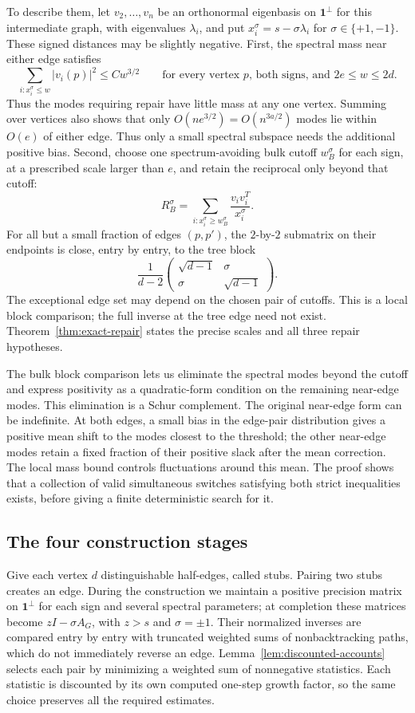 To describe them, let $v_2,\ldots,v_n$ be an orthonormal eigenbasis on
$\mathbf1^\perp$ for this intermediate graph, with eigenvalues
$\lambda_i$, and put $x_i^\sigma=s-\sigma\lambda_i$ for
$\sigma\in\{+1,-1\}$. These signed distances may be slightly negative.
First, the spectral mass near either edge satisfies
\[
 \sum_{i:x_i^\sigma\le w}|v_i(p)|^2\le Cw^{3/2}
 \qquad\text{for every vertex $p$, both signs, and $2e\le w\le2d$}.
\]
Thus the modes requiring repair have little mass at any one vertex.
Summing over vertices also shows that only $O(ne^{3/2})=O(n^{3a/2})$
modes lie within $O(e)$ of either edge. Thus only a small spectral
subspace needs the additional positive bias.
Second, choose one spectrum-avoiding bulk cutoff $w_B^\sigma$ for each sign,
at a prescribed scale larger than $e$, and retain the reciprocal only beyond that cutoff:
\[
 R_B^\sigma=\sum_{i:x_i^\sigma\ge w_B^\sigma}
                  \frac{v_iv_i^T}{x_i^\sigma}.
\]
For all but a small fraction of edges $(p,p')$, the $2$-by-$2$ submatrix
on their endpoints is close, entry by entry, to the tree block
\[
 \frac1{d-2}
 \begin{pmatrix}\sqrt{d-1}&\sigma\\ \sigma&\sqrt{d-1}\end{pmatrix}.
\]
The exceptional edge set may depend on the chosen pair of cutoffs.
This is a local block comparison; the full inverse at the tree edge
need not exist. Theorem~\ref{thm:exact-repair} states the precise scales
and all three repair hypotheses.

The bulk block comparison lets us eliminate the spectral modes beyond
the cutoff and express positivity as a quadratic-form condition on the
remaining near-edge modes. This elimination is a Schur complement.
The original near-edge form can be indefinite. At both edges, a small bias
in the edge-pair distribution gives a positive mean shift to the modes
closest to the threshold; the other near-edge modes retain a fixed
fraction of their positive slack after the mean correction. The local
mass bound controls fluctuations around this mean.
The proof shows that a collection of valid simultaneous switches
satisfying both strict inequalities exists, before giving a finite
deterministic search for it.

\subsection{The four construction stages}

Give each vertex $d$ distinguishable half-edges, called stubs. Pairing
two stubs creates an edge. During the construction we maintain a
positive precision matrix on $\mathbf1^\perp$ for each sign and several
spectral parameters;
at completion these matrices become $zI-\sigma A_G$, with $z>s$ and
$\sigma=\pm1$. Their normalized inverses are compared entry by entry
with truncated weighted sums of nonbacktracking paths, which do not
immediately reverse an edge. Lemma~\ref{lem:discounted-accounts}
selects each pair by minimizing a weighted sum of nonnegative statistics.
Each statistic is discounted by its own computed one-step growth factor,
so the same choice preserves all the required estimates.

